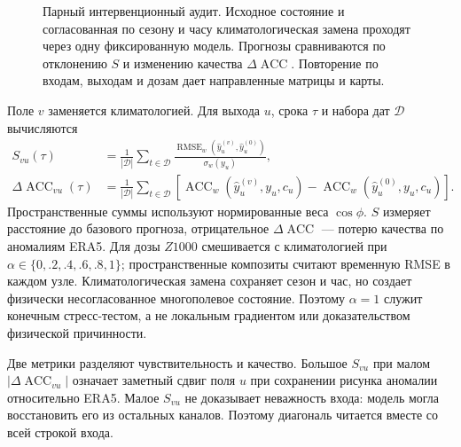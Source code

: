 \documentclass{article}
\newcommand{\rmse}{\operatorname{RMSE}}
\newcommand{\acc}{\operatorname{ACC}}
\begin{document}
\begin{figure}[t]
{}
\caption{Парный интервенционный аудит. Исходное состояние и согласованная по сезону и часу климатологическая замена проходят через одну фиксированную модель. Прогнозы сравниваются по отклонению $S$ и изменению качества $\Delta\acc$. Повторение по входам, выходам и дозам дает направленные матрицы и карты.}
\label{fig:method}
\end{figure}

Поле $v$ заменяется климатологией. Для выхода $u$, срока $\tau$ и набора дат $\mathcal D$ вычисляются
\begin{align}
S_{vu}(\tau)&=\frac{1}{|\mathcal D|}\sum_{t\in\mathcal D}
\frac{\rmse_w(\hat y_u^{(v)},\hat y_u^{(0)})}{\sigma_w(y_u)}, \\
\Delta\acc_{vu}(\tau)&=\frac{1}{|\mathcal D|}\sum_{t\in\mathcal D}
\left[\acc_w(\hat y_u^{(v)},y_u,c_u)-\acc_w(\hat y_u^{(0)},y_u,c_u)\right].
\end{align}
Пространственные суммы используют нормированные веса $\cos\phi$. $S$ измеряет расстояние до базового прогноза, отрицательное $\Delta\acc$ --- потерю качества по аномалиям ERA5. Для дозы $Z1000$ смешивается с климатологией при $\alpha\in\{0,.2,.4,.6,.8,1\}$; пространственные композиты считают временную RMSE в каждом узле. Климатологическая замена сохраняет сезон и час, но создает физически несогласованное многополевое состояние. Поэтому $\alpha=1$ служит конечным стресс-тестом, а не локальным градиентом или доказательством физической причинности.

Две метрики разделяют чувствительность и качество. Большое $S_{vu}$ при малом $|\Delta\acc_{vu}|$ означает заметный сдвиг поля $u$ при сохранении рисунка аномалии относительно ERA5. Малое $S_{vu}$ не доказывает неважность входа: модель могла восстановить его из остальных каналов. Поэтому диагональ читается вместе со всей строкой входа.
\end{document}
